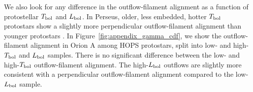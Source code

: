 \documentclass[twocolumn]{aastex63}
\begin{document}
We also look for any difference in the outflow-filament alignment as a function of protostellar $T_{\rm bol}$ and $L_{\rm bol}$. In Perseus, older, less embedded, hotter $T_{\rm bol}$ protostars show a slightly more perpendicular outflow-filament alignment than younger protostars \citep{Stephens17}. In Figure~\ref{fig:appendix_gamma_cdf}, we show the outflow-filament alignment in Orion A among HOPS protostars, split into low- and high-$T_{\rm bol}$ and $L_{\rm bol}$ samples. There is no significant difference between the low- and high-$T_{\rm bol}$ outflow-filament alignment. The high-$L_{\rm bol}$ outflows are slightly more consistent with a perpendicular outflow-filament alignment compared to the low-$L_{\rm bol}$ sample.

\begin{figure}
\begin{minipage}{.5\linewidth}
\centering
{}
\end{minipage}%
\begin{minipage}{.5\linewidth}
\centering
{}

\end{minipage}
\end{figure}
\end{document}
